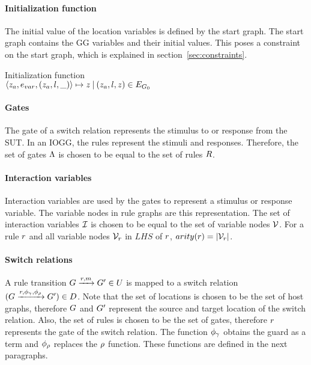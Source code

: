 \paragraph*{Initialization function}
The initial value of the location variables is defined by the start graph. The start graph contains the GG variables and their initial values. This poses a constraint on the start graph, which is explained in section~\ref{sec:constraints}. 
\vspace{10px}\begin{definition} Initialization function
\vspace{2px} \\
$\langle z_a, e_{var}, (z_a, l, \_)\rangle \mapsto z\:|\:(z_a, l, z) \in E_{G_0}$
\end{definition}
\vspace{10px}

\paragraph*{Gates}
The gate of a switch relation represents the stimulus to or response from the SUT. In an IOGG, the rules represent the stimuli and responses. Therefore, the set of gates $\Lambda$ is chosen to be equal to the set of rules $R$.

\paragraph*{Interaction variables}
Interaction variables are used by the gates to represent a stimulus or response variable. The variable nodes in rule graphs are this representation. The set of interaction variables $\mathcal{I}$ is chosen to be equal to the set of variable nodes $\mathcal{V}$. For a rule $r$ and all variable nodes $\mathcal{V}_r$ in $\mathit{LHS}$ of $r$, $arity(r) = |\mathcal{V}_r|$.

\paragraph*{Switch relations}
A rule transition $G \xrightarrow{r, m} G' \in U$ is mapped to a switch relation $(G\xrightarrow{r, \phi_{\gamma}, \phi_{\rho}}G') \in D$. Note that the set of locations is chosen to be the set of host graphs, therefore $G$ and $G'$ represent the source and target location of the switch relation. Also, the set of rules is chosen to be the set of gates, therefore $r$ represents the gate of the switch relation. The function $\phi_{\gamma}$ obtains the guard as a term and $\phi_{\rho}$ replaces the $\rho$ function. These functions are defined in the next paragraphs.

